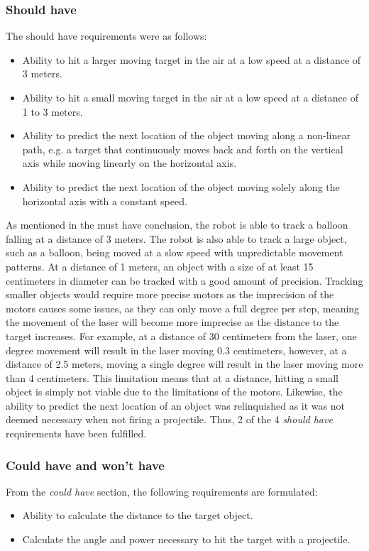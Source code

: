 \subsubsection{Should have}
The should have requirements were as follows:
\begin{itemize}
	\item Ability to hit a larger moving target in the air at a low speed at a distance of 3 meters.
	\item Ability to hit a small moving target in the air at a low speed at a distance of 1 to 3 meters.
	\item Ability to predict the next location of the object moving along a non-linear path, e{.}g{.} a target that continuously moves back and forth on the vertical axis while moving linearly on the horizontal axis.
	\item Ability to predict the next location of the object moving solely along the horizontal axis with a constant speed.
\end{itemize}

As mentioned in the must have conclusion, the robot is able to track a balloon falling at a distance of 3 meters.
The robot is also able to track a large object, such as a balloon, being moved at a slow speed with unpredictable movement patterns.
At a distance of 1 meters, an object with a size of at least 15 centimeters in diameter can be tracked with a good amount of precision.
Tracking smaller objects would require more precise motors as the imprecision of the motors causes some issues, as they can only move a full degree per step, meaning the movement of the laser will become more imprecise as the distance to the target increases.
For example, at a distance of 30 centimeters from the laser, one degree movement will result in the laser moving 0.3 centimeters, however, at a distance of 2.5 meters, moving a single degree will result in the laser moving more than 4 centimeters.
This limitation means that at a distance, hitting a small object is simply not viable due to the limitations of the motors.
Likewise, the ability to predict the next location of an object was relinquished as it was not deemed necessary when not firing a projectile.
Thus, 2 of the 4 \textit{should have} requirements have been fulfilled.

\subsubsection{Could have and won't have}
From the \textit{could have} section, the following requirements are formulated:
\begin{itemize}
	\item Ability to calculate the distance to the target object.
	\item Calculate the angle and power necessary to hit the target with a projectile.
\end{itemize}

